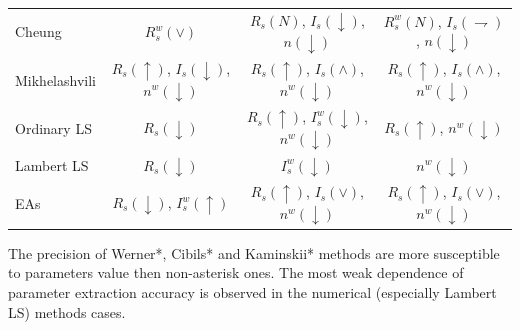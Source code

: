 \documentclass[aip,jap,reprint]{revtex4-1}
\begin{document}
\begin{table}
\begin{ruledtabular}
\begin{tabular}{lccc}
Cheung &$R_s^w(\vee)$&$R_s(N)$, $I_s(\downarrow)$, $n(\downarrow)$&$R_s^w(N)$, $I_s(\rightharpoondown)$, $n(\downarrow)$\\
Mikhelashvili &$R_s(\uparrow)$, $I_s(\downarrow)$, $n^w(\downarrow)$&$R_s(\uparrow)$, $I_s(\wedge)$, $n^w(\downarrow)$&$R_s(\uparrow)$, $I_s(\wedge)$, $n^w(\downarrow)$\\
Ordinary LS &$R_s(\downarrow)$&$R_s(\uparrow)$, $I_s^w(\downarrow)$, $n^w(\downarrow)$&$R_s(\uparrow)$, $n^w(\downarrow)$\\
Lambert LS &$R_s(\downarrow)$&$I_s^w(\downarrow)$&$n^w(\downarrow)$\\
EAs &$R_s(\downarrow)$, $I_s^w(\uparrow)$&$R_s(\uparrow)$, $I_s(\vee)$, $n^w(\downarrow)$&$R_s(\uparrow)$, $I_s(\vee)$, $n^w(\downarrow)$\\
\end{tabular}
\end{ruledtabular}
\end{table}


The precision of Werner*, Cibils* and Kaminskii* methods are more susceptible to parameters value then non-asterisk ones.
The most weak dependence of parameter extraction accuracy is observed in the numerical  (especially Lambert LS) methods  cases.
\end{document}
